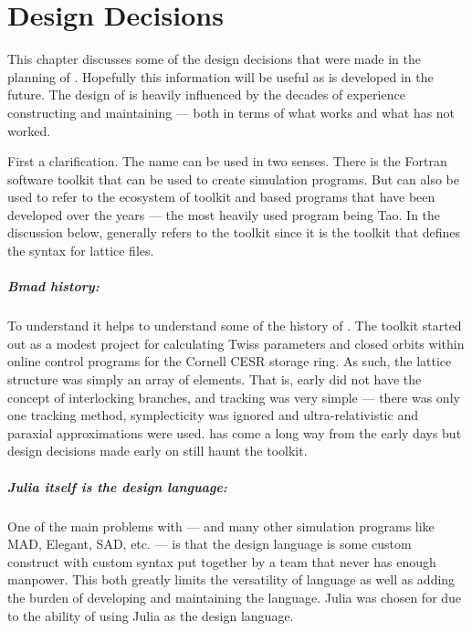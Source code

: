 \chapter{Design Decisions}
\label{c:design}

This chapter discusses some of the design decisions that were made in the planning of \accellat.
Hopefully this information will be useful as \accellat is developed in the future.
The design of \accellat is heavily influenced by the decades of experience constructing and maintaining
\bmad --- both in terms of what works and what has not worked.

First a clarification. The name \bmad 
can be used in two senses. There is \bmad the Fortran software toolkit
that can be used to create simulation programs. But \bmad can also be used to refer to the 
ecosystem of toolkit and \bmad based programs that have been developed over the years --- the
most heavily used program being Tao. In the discussion below, \bmad generally refers to the toolkit
since it is the toolkit that defines the syntax for \bmad lattice files.

\paragraph{Bmad history:}
To understand \bmad it helps to understand some of the history of \bmad. The \bmad toolkit 
started out as a modest project for calculating Twiss parameters and closed orbits within online control
programs for the Cornell CESR storage ring. As such, the lattice structure was simply an array
of elements. That is, early \bmad did not have the concept of interlocking branches, and tracking was very simple ---
there was only one tracking method, symplecticity was ignored and ultra-relativistic and 
paraxial approximations were used. 
\bmad has come a long way from the early days but design decisions made early on still haunt the \bmad
toolkit. 

\paragraph{Julia itself is the design language:}
One of the main problems with \bmad --- and many other simulation programs like MAD, Elegant, SAD, etc. ---
is that the design language is some custom construct with custom syntax put together by a team that
never has enough manpower. This both greatly limits the versatility of language as well as adding
the burden of developing and maintaining the language. Julia was chosen for \accellat
due to the ability of using Julia as the design language.

